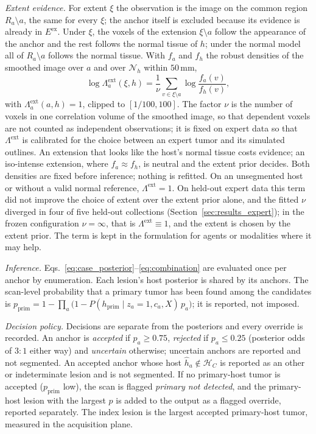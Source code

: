 \documentclass[fleqn,10pt]{olplainarticle}
\begin{document}
\emph{Extent evidence.} For extent $\xi$ the observation is the image on the common region $R_a\setminus a$, the same for
every $\xi$; the anchor itself is excluded because its evidence is already in $E^{\mathrm{ex}}$. Under $\xi$, the voxels of
the extension $\xi\setminus a$ follow the appearance of the anchor and the rest follows the normal tissue of $h$; under the
normal model all of $R_a\setminus a$ follows the normal tissue. With $f_a$ and $f_h$ the robust densities of the smoothed
image over $a$ and over $\mathcal{N}_h$ within $50$\,mm,
\begin{equation}
\label{eq:extent_evidence}
\log\Lambda^{\mathrm{ext}}_a(\xi,h)=\frac{1}{\nu}\sum_{v\in\xi\setminus a}\log\frac{f_a(v)}{f_h(v)},
\end{equation}
with $\Lambda^{\mathrm{ext}}_a(a,h)=1$, clipped to $[1/100,100]$. The factor $\nu$ is the number of voxels in one
correlation volume of the smoothed image, so that dependent voxels are not counted as independent observations; it is
fixed on expert data so that $\Lambda^{\mathrm{ext}}$ is calibrated for the choice between an expert tumor and its
simulated outlines. An extension that looks like the host's normal tissue costs evidence; an iso-intense extension, where
$f_a\approx f_h$, is neutral and the extent prior decides. Both densities are fixed before inference; nothing is refitted.
On an unsegmented host or without a valid normal reference, $\Lambda^{\mathrm{ext}}=1$. On held-out expert data this term did
not improve the choice of extent over the extent prior alone, and the fitted $\nu$ diverged in four of five held-out
collections (Section~\ref{sec:results_expert}); in the frozen configuration $\nu=\infty$, that is $\Lambda^{\mathrm{ext}}\equiv1$, and the
extent is chosen by the extent prior. The term is kept in the formulation for agents or modalities where it may help.

\emph{Inference.} Eqs.~\eqref{eq:case_posterior}--\eqref{eq:combination} are evaluated once per anchor by enumeration.
Each lesion's
host posterior is shared by its anchors. The scan-level probability that a primary tumor has been found among the
candidates is $p_{\mathrm{prim}}=1-\prod_a\bigl(1-P(h_{\mathrm{prim}}\mid z_a=1,c_a,X)\,p_a\bigr)$; it is reported, not
imposed.

\emph{Decision policy.} Decisions are separate from the posteriors and every override is recorded. An anchor is
\emph{accepted} if $p_a\ge0.75$, \emph{rejected} if $p_a\le0.25$ (posterior odds of $3{:}1$ either way) and
\emph{uncertain} otherwise; uncertain anchors are reported and not segmented. An accepted anchor whose host
$\hat h_a\notin\mathcal{H}_C$ is reported as an other or indeterminate lesion and is not segmented. If no primary-host
tumor is accepted ($p_{\mathrm{prim}}$ low), the scan is flagged \emph{primary not detected}, and the primary-host lesion
with the largest $p$ is added to the output as a flagged override, reported separately. The index lesion is the largest
accepted primary-host tumor, measured in the acquisition plane.
\end{document}
